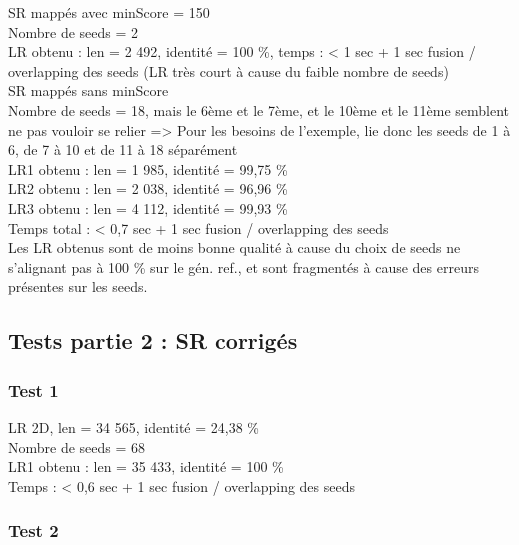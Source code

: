\documentclass[12pt]{article}
\begin{document}
SR mappés avec minScore = 150 \\

Nombre de seeds = 2 \\

LR obtenu : len = 2 492, identité = 100 \%, temps : < 1 sec + 1 sec fusion / overlapping des seeds (LR très court à cause du faible nombre de seeds) \\

SR mappés sans minScore \\

Nombre de seeds = 18, mais le 6ème et le 7ème, et le 10ème et le 11ème semblent ne pas vouloir se relier => Pour les besoins de l'exemple, lie donc les seeds de 1 à 6, de 7 à 10 et de 11 à 18 séparément  \\

LR1 obtenu : len = 1 985, identité = 99,75 \% \\
LR2 obtenu : len = 2 038, identité = 96,96 \% \\
LR3 obtenu : len = 4 112, identité = 99,93 \% \\
Temps total : < 0,7 sec + 1 sec fusion / overlapping des seeds \\

Les LR obtenus sont de moins bonne qualité à cause du choix de seeds ne s'alignant pas à 100 \% sur le gén. ref., et sont fragmentés à cause des erreurs présentes sur les seeds.


\subsection{Tests partie 2 : SR corrigés}

\subsubsection{Test 1}

LR 2D, len = 34 565, identité = 24,38 \% \\

Nombre de seeds = 68 \\

LR1 obtenu : len = 35 433, identité = 100 \% \\
Temps : < 0,6 sec + 1 sec fusion / overlapping des seeds \\

\subsubsection{Test 2}
\end{document}
